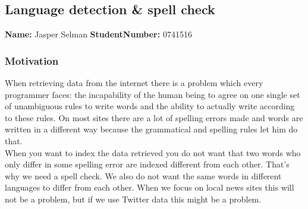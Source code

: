 \subsection{Language detection \& spell check}
\textbf{Name:} Jasper Selman \indent \textbf{StudentNumber:} 0741516

\subsubsection*{Motivation}
When retrieving data from the internet there is a problem which every programmer faces: the incapability of the human being to agree on one single set of unambiguous rules to write words and the ability to actually write according to these rules. On most sites there are a lot of spelling errors made and words are written in a different way because the grammatical and spelling rules let him do that. \\
When you want to index the data retrieved you do not want that two words who only differ in some spelling error are indexed different from each other. That's why we need a spell check. We also do not want the same words in different languages to differ from each other. When we focus on local news sites this will not be a problem, but if we use Twitter data this might be a problem.

